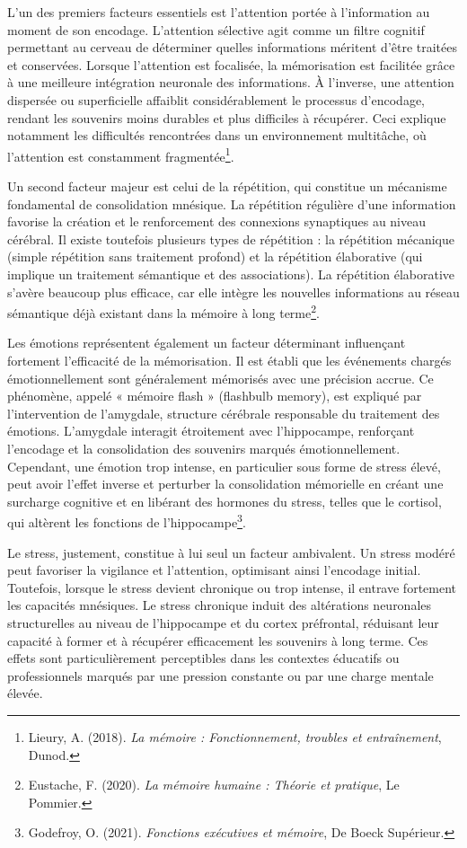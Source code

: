 \documentclass[12pt,a4paper]{report}
\begin{document}
L’un des premiers facteurs essentiels est l’attention portée à l’information au moment de son encodage. L’attention sélective agit comme un filtre cognitif permettant au cerveau de déterminer quelles informations méritent d’être traitées et conservées. Lorsque l’attention est focalisée, la mémorisation est facilitée grâce à une meilleure intégration neuronale des informations. À l’inverse, une attention dispersée ou superficielle affaiblit considérablement le processus d’encodage, rendant les souvenirs moins durables et plus difficiles à récupérer. Ceci explique notamment les difficultés rencontrées dans un environnement multitâche, où l’attention est constamment fragmentée\footnote{Lieury, A. (2018). \textit{La mémoire : Fonctionnement, troubles et entraînement}, Dunod.}.

Un second facteur majeur est celui de la répétition, qui constitue un mécanisme fondamental de consolidation mnésique. La répétition régulière d’une information favorise la création et le renforcement des connexions synaptiques au niveau cérébral. Il existe toutefois plusieurs types de répétition : la répétition mécanique (simple répétition sans traitement profond) et la répétition élaborative (qui implique un traitement sémantique et des associations). La répétition élaborative s’avère beaucoup plus efficace, car elle intègre les nouvelles informations au réseau sémantique déjà existant dans la mémoire à long terme\footnote{Eustache, F. (2020). \textit{La mémoire humaine : Théorie et pratique}, Le Pommier.}.

Les émotions représentent également un facteur déterminant influençant fortement l’efficacité de la mémorisation. Il est établi que les événements chargés émotionnellement sont généralement mémorisés avec une précision accrue. Ce phénomène, appelé « mémoire flash » (flashbulb memory), est expliqué par l’intervention de l’amygdale, structure cérébrale responsable du traitement des émotions. L’amygdale interagit étroitement avec l’hippocampe, renforçant l’encodage et la consolidation des souvenirs marqués émotionnellement. Cependant, une émotion trop intense, en particulier sous forme de stress élevé, peut avoir l’effet inverse et perturber la consolidation mémorielle en créant une surcharge cognitive et en libérant des hormones du stress, telles que le cortisol, qui altèrent les fonctions de l’hippocampe\footnote{Godefroy, O. (2021). \textit{Fonctions exécutives et mémoire}, De Boeck Supérieur.}.

Le stress, justement, constitue à lui seul un facteur ambivalent. Un stress modéré peut favoriser la vigilance et l’attention, optimisant ainsi l’encodage initial. Toutefois, lorsque le stress devient chronique ou trop intense, il entrave fortement les capacités mnésiques. Le stress chronique induit des altérations neuronales structurelles au niveau de l’hippocampe et du cortex préfrontal, réduisant leur capacité à former et à récupérer efficacement les souvenirs à long terme. Ces effets sont particulièrement perceptibles dans les contextes éducatifs ou professionnels marqués par une pression constante ou par une charge mentale élevée.
\end{document}
